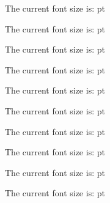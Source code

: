 \documentclass[10pt]{ctsDIGI}
\makeatletter
\newcommand\thefontsize[1]{{#1 The current font size is: \f@size pt\par}}
\makeatother
\begin{document}
\sffamily
\thefontsize\tiny
\thefontsize\scriptsize
\thefontsize\footnotesize
\thefontsize\small
\thefontsize\normalsize
\thefontsize\large
\thefontsize\Large
\thefontsize\LARGE
\thefontsize\huge
\thefontsize\Huge
\end{document}
